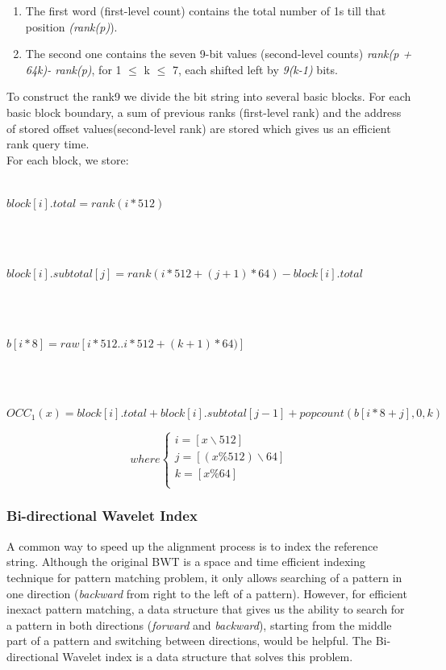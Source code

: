 \documentclass[11pt,a4paper]{report}
\begin{document}
\begin{enumerate}

	\item The first word (first-level count) contains the 
	total number of 1s till that position \emph{(rank(p)}).
	
	\item The second one contains the seven 9-bit values 
	(second-level counts) \emph{rank(p + 64k)- rank(p)}, 
	for 1 $\leq$ k $\leq$ 7, each shifted left by \emph
	{9(k-1)} bits.
	
\end{enumerate}

To construct the rank9  we divide the bit string into 
several basic blocks. For each basic block boundary, 
a sum of previous ranks (first-level rank) and the 
address of stored offset values(second-level rank) 
are stored which gives us an efficient rank query 
time. \\

For each block, we store:\\\\
\centerline{$ block[i].total= rank(i*512)$}\\\\
\centerline{$ block[i].subtotal[j]= rank(i*512 + (j+1)*64)-block[i].total$}\\\\
\centerline{$ b[i*8]=raw[i*512..i*512+(k+1)*64)] $}\\\\
\centerline{$ OCC_{1}(x)=block[i].total+block[i].subtotal[j-1]+popcount(b[i*8 + j],0,k)$}



\[ where
\begin{cases}
	i=[ x \backslash 512 ]\\
	j=[(x \% 512 )\backslash 64 ]\\
	k=[ x \% 64  ]\\
\end{cases}
\]




\subsubsection{Bi-directional Wavelet Index}

A common way to speed up the alignment process is to index the reference string. 
Although the original BWT is a space and time efficient indexing technique for 
pattern matching problem, it only allows  searching of a pattern in one 
direction (\emph{backward} from right to the left of a pattern). 
However, for efficient inexact pattern matching, a data structure that gives us 
the ability to search for a pattern in both directions (\emph{forward}
and \emph{backward}), 
starting from the middle part of a pattern and switching between
directions, would 
be helpful. The Bi-directional Wavelet index is a data structure that solves 
this problem.
\end{document}
